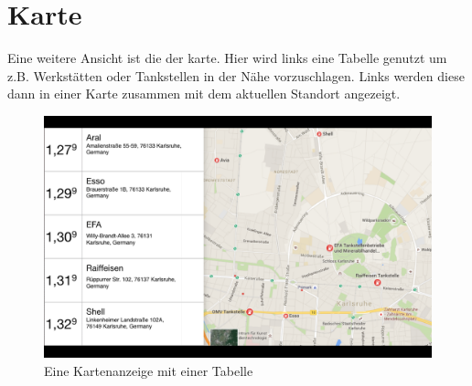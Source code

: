 \documentclass[pflichtenheft.tex]{subfiles}
\begin{document}
\clearpage
\section{Karte}
\label{sec:Karte}

Eine weitere Ansicht ist die der karte. Hier wird links eine Tabelle genutzt um z.B. Werkstätten oder Tankstellen in der Nähe vorzuschlagen. Links werden diese dann in einer Karte zusammen mit dem aktuellen Standort angezeigt.

\begin{figure}[H]
  	\begin{center}
 		\includegraphics[width=\textwidth]{Images/GUI-Map.png}
  		\caption{Eine Kartenanzeige mit einer Tabelle}
  	\end{center}
\end{figure}
\end{document}
